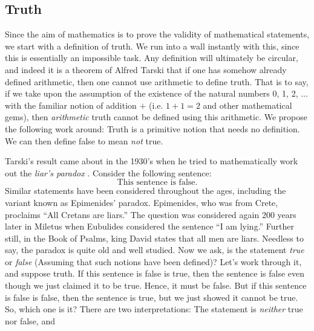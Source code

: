     \subsection{Truth}
        Since the aim of mathematics is to prove the validity of mathematical
        statements, we start with a definition of truth. We run into a wall
        instantly with this, since this is essentially an impossible task. Any
        definition will ultimately be circular, and indeed it is a theorem of
        Alfred Tarski that if one has somehow already
        defined arithmetic, then one cannot use arithmetic to define truth. That
        is to say, if we take upon the assumption of the existence of the
        natural numbers 0, 1, 2, $\dots$ with the familiar notion of addition
        $+$ (i.e. $1+1=2$ and other mathematical gems), then \textit{arithmetic}
        truth cannot be defined using this arithmetic. We propose the following
        work around: Truth is a primitive notion that needs no definition. We
        can then define false to mean \textit{not} true.
        \par\hfill\par
        Tarski's result came about in the 1930's when he tried to mathematically
        work out the \textit{liar's paradox}%
        . Consider the following sentence:
        \begin{equation}
            \text{This sentence is false.}
        \end{equation}
        Similar statements have been considered throughout the ages, including
        the variant known as Epimenides' paradox.
        Epimenides, who was from Crete, proclaims ``All Cretans are liars.''
        The question was considered again 200 years later in Miletus when
        Eubulides considered the sentence ``I am lying.'' Further still, in the
        Book of Psalms, king David states that all men are liars. Needless to
        say, the paradox is quite old and well studied. Now we ask, is the
        statement \textit{true} or \textit{false} (Assuming that such notions
        have been defined)? Let's work through it, and suppose truth. If
        this sentence is false is true, then the sentence is false even though
        we just claimed it to be true. Hence, it must be false. But if this
        sentence is false is false, then the sentence is true, but we just
        showed it cannot be true. So, which one is it? There are two
        interpretations: The statement is \textit{neither} true nor false, and
